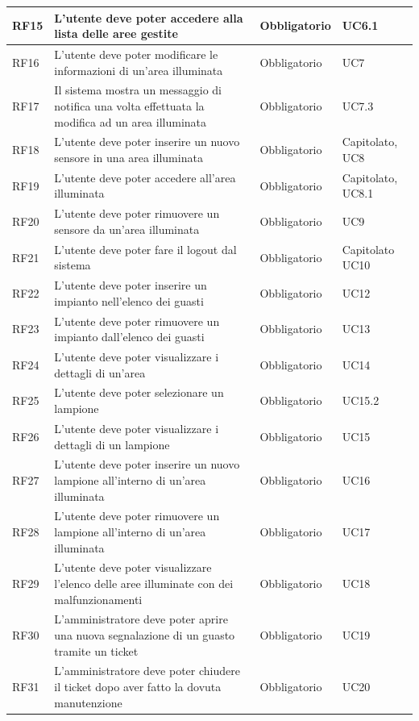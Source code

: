 \documentclass[12pt]{article}
\begin{document}
\begin{tabularx}{\linewidth}{|>{\hsize=0.6\hsize}X|>{\hsize=1.8\hsize}X|>{\hsize=1\hsize}X|>{\hsize=0.6\hsize}X|}
\hline				
RF15	 & L'utente deve poter accedere alla lista delle aree gestite & Obbligatorio & UC6.1 \\
\hline				
RF16	 & L'utente deve poter modificare le informazioni di un'area illuminata & Obbligatorio & UC7 \\
\hline				
RF17	 & Il sistema mostra un messaggio di notifica una volta effettuata la modifica ad un area illuminata & Obbligatorio	& UC7.3 \\
\hline				
RF18	 & L'utente deve poter inserire un nuovo sensore in una area illuminata & Obbligatorio & Capitolato, UC8 \\
\hline				
RF19	 & L'utente deve poter accedere all'area illuminata & Obbligatorio & Capitolato, UC8.1 \\
\hline 				
RF20	 & L'utente deve poter rimuovere un sensore da un'area illuminata & Obbligatorio & UC9 \\
\hline				
RF21	 & L'utente deve poter fare il logout dal sistema & Obbligatorio & Capitolato UC10 \\
\hline										
RF22	 & L'utente deve poter inserire un impianto nell'elenco dei guasti & Obbligatorio & UC12 \\
\hline				
RF23	 & L'utente deve poter rimuovere un impianto dall'elenco dei guasti & Obbligatorio & UC13 \\
\hline				
RF24	 & L'utente deve poter visualizzare i dettagli di un'area & Obbligatorio & UC14 \\
\hline				
RF25	 & L'utente deve poter selezionare un lampione & Obbligatorio & UC15.2\\
\hline				
RF26	 & L'utente deve poter visualizzare i dettagli di un lampione & Obbligatorio & UC15\\
\hline				
RF27	 & L'utente deve poter inserire un nuovo lampione all'interno di un'area illuminata & Obbligatorio & UC16 \\
\hline				
RF28	 & L'utente deve poter rimuovere un lampione all'interno di un'area illuminata & Obbligatorio & UC17 \\
\hline				
RF29	 & L'utente deve poter visualizzare l'elenco delle aree illuminate con dei malfunzionamenti & Obbligatorio & UC18 \\
\hline				
RF30	 & L'amministratore deve poter aprire una nuova segnalazione di un guasto tramite un ticket & Obbligatorio & UC19 \\
\hline				
RF31	 & L'amministratore deve poter chiudere il ticket dopo aver fatto la dovuta manutenzione & Obbligatorio & UC20 \\

\end{tabularx}
\end{document}
